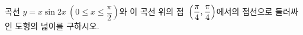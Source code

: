 \hspace*{2mm}\begin{minipage}[t]{\dimexpr\linewidth-2mm\relax}\vspace{0pt}
곡선 $y=x\sin 2x\ \left(0\le x\le\dfrac{\pi}{2}\right)$와 이 곡선 위의 점~$\left(\dfrac{\pi}{4}{,}\mkern3mu\mathopen{}\dfrac{\pi}{4}\right)$에서의 접선으로 둘러싸인 도형의 넓이를 구하시오.\end{minipage}
